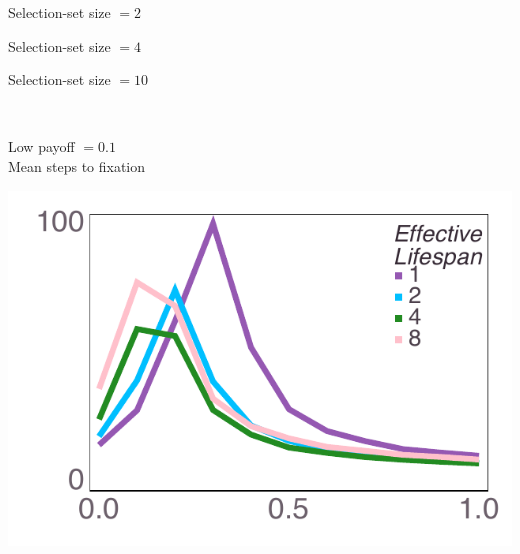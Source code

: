 \documentclass[varwidth=true,crop=false]{standalone}
\begin{document}
    \begin{minipage}{3.75in}
      \centering
      {\hspace{5.25em}\huge Selection-set size $ = 2$}
    \end{minipage}%
    \begin{minipage}{3.75in}
      \centering
      {\hspace{5.25em}\huge Selection-set size $ = 4$}
    \end{minipage}%
    \begin{minipage}{3.75in}
      \centering
      {\hspace{5.25em}\huge Selection-set size $ = 10$}
    \end{minipage}~\\

    \begin{minipage}{3.75in}
    \begin{rotate}{90}
      {\parbox{3.0in}{
          \centering
          \vspace{-1.0em}\hspace{-2.5em} {\huge Low payoff $ = 0.1$} \\[1em]
          {\huge Mean steps to fixation}
      }}
    \end{rotate}%
    \hspace{2em}
      \includegraphics[width=\textwidth]{Figures/step_over_u_lowpayoff=0.1_nbehaviors=2.pdf}
    \end{minipage}\noindent\hspace{1.25em}
\end{document}
